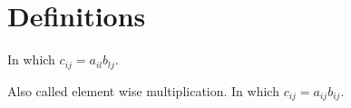 \documentclass{article}
\title{}
\date{06-07-2021}
\author{Anjali Bhavan}
\begin{document}
\maketitle
\section{Definitions}
\begin{definition} In which $ c_{ij} = a_{il}b_{lj} $. 
\end{definition}
\begin{definition} Also called element wise multiplication. In which $ c_{ij} = a_{ij}b_{ij} $. 
\end{definition}
\end{document}
